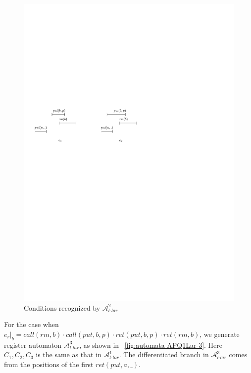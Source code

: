\begin{figure}[htbp]
  \centering
  \includegraphics[width=0.7 \textwidth]{figures/PIC_HIS_PQ1Lar-prpr.pdf}
  \caption{Conditions recognized by $\mathcal{A}_{\textit{l-lar}}^2$}
  \label{fig:his for APQ1Lar-2}
\end{figure}

For the case when $e_r \vert_{b} = \textit{call}(\textit{rm},b) \cdot \textit{call}(\textit{put},b,p) \cdot \textit{ret}(\textit{put},b,p) \cdot \textit{ret}(\textit{rm},b)$, we generate register automaton $\mathcal{A}_{\textit{l-lar}}^3$, as shown in \figurename~\ref{fig:automata APQ1Lar-3}. Here $C_1,C_2,C_3$ is the same as that in $\mathcal{A}_{\textit{l-lar}}^1$. The differentiated branch in $\mathcal{A}_{\textit{l-lar}}^3$ comes from the positions of the first $\textit{ret}(\textit{put},a,\_)$.


